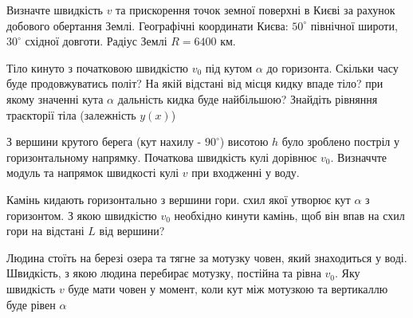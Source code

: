 \justifying
\begin{problem}{1}
	Визначте швидкість $v$ та прискорення точок земної поверхні в Києві за рахунок добового обертання Землі. Географічні координати Києва: $50^{\circ}$ північної широти,$30^{\circ}$ східної довготи. Радіус Землі $R = 6400$ км.
\end{problem}

\begin{problem}{2}
	Тіло кинуто з початковою швидкістю $v_0$ під кутом $\alpha$ до горизонта. Скільки часу буде продовжуватись політ? На якій відстані від місця кидку впаде тіло? при якому значенні кута $\alpha$ дальність кидка буде найбільшою? Знайдіть рівняння траєкторії тіла (залежність $y(x)$)
\end{problem}

\begin{problem}{3}
	З вершини крутого берега (кут нахилу - $90^{\circ}$) висотою $h$ було зроблено постріл у горизонтальному напрямку. Початкова швидкість кулі дорівнює $v_0$. Визначчте модуль та напрямок швидкості кулі $v$ при входженні у воду.
\end{problem}

\begin{problem}{4}
	Камінь кидають горизонтально з вершини гори. схил якої утворює кут $\alpha$ з горизонтом. З якою швидкістю $v_0$ необхідно кинути камінь, щоб він впав на схил гори на відстані $L$ від вершини?
\end{problem}

\begin{problem}{5}
	Людина стоїть на березі озера та тягне за мотузку човен, який знаходиться у воді. Швидкість, з якою людина перебирає мотузку, постійна та рівна $v_0$. Яку швидкість $v$ буде мати човен у момент, коли кут між мотузкою та вертикаллю буде рівен $\alpha$
\end{problem}



